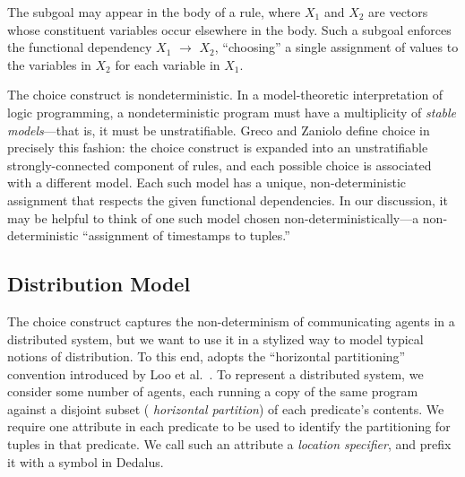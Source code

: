 The subgoal  may appear
in the body of a rule, where \emph{$X_1$} and \emph{$X_2$} are vectors
whose constituent variables occur elsewhere in the body.  Such a
subgoal enforces the functional dependency \emph{$X_1$} $\to$ $X_2$,
``choosing'' a single assignment of values to the variables in
\emph{$X_2$} for each variable in \emph{$X_1$}.

The choice construct is nondeterministic.  In a model-theoretic interpretation of logic programming, a nondeterministic program 
must have a multiplicity of {\em stable models}---that is, it must be unstratifiable.  
Greco and Zaniolo define 
choice in precisely this fashion: the choice construct is expanded into an unstratifiable strongly-connected component of rules, 
and each possible choice is associated with a different model.  Each such model has a unique, non-deterministic assignment that
respects the given functional dependencies.  In our discussion, it may be helpful to think of one such model chosen non-deterministically---a non-deterministic ``assignment of timestamps to tuples.''


\subsection{Distribution Model}
The choice construct captures the non-determinism of communicating agents in a distributed system, but we want to use it in a stylized way to model typical notions of distribution.  To this end, \lang adopts the ``horizontal partitioning'' convention introduced by Loo et al.~\cite{Loo:2005}.
To represent a distributed system, we consider some number of agents,
each running a copy of the same program against a disjoint subset ({\em
  horizontal partition}) of each predicate's contents.  We require one
attribute in each predicate to be used to identify the
partitioning for tuples in that predicate. We call such an
attribute a {\em location specifier}, and prefix it with a
\dedalus{\#} symbol in Dedalus.

